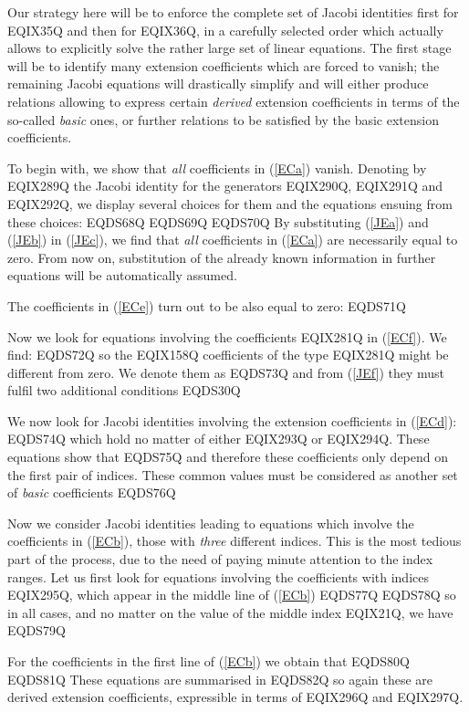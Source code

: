 Our strategy here will be to enforce the complete set of Jacobi
identities  first for EQIX35Q and then for EQIX36Q, in
a carefully selected order which actually allows to explicitly
solve the rather large set of linear equations. The first stage
will be to identify many extension coefficients which are forced to
vanish; the remaining Jacobi equations will drastically simplify
and will either produce relations allowing to express certain
\emph{derived} extension coefficients in terms of the so-called
\emph{basic} ones, or further relations to be satisfied by the basic
extension coefficients.

To begin with, we show that \emph{all} coefficients in
(\ref{ECa}) vanish.  Denoting by EQIX289Q the Jacobi
identity for the generators EQIX290Q,
EQIX291Q and EQIX292Q, we display several choices for them
and the equations ensuing from these choices:
EQDS68Q
EQDS69Q
EQDS70Q
By substituting (\ref{JEa}) and (\ref{JEb}) in (\ref{JEc}), we find
that \emph{all} coefficients in (\ref{ECa})  are necessarily equal to
zero. From now on, substitution of the already known information in
further equations will be automatically assumed.

The coefficients  in (\ref{ECe}) turn out to be also equal to zero:
EQDS71Q

Now we look for equations involving the  coefficients EQIX281Q
in (\ref{ECf}). We find:
EQDS72Q
so the EQIX158Q coefficients of the type EQIX281Q might be
different from zero. We denote them as
EQDS73Q
and from  (\ref{JEf}) they must fulfil two additional conditions
EQDS30Q

We now look for Jacobi identities involving the  extension
coefficients in (\ref{ECd}):
EQDS74Q
which hold no matter of either EQIX293Q or EQIX294Q. These
equations show that
EQDS75Q
and therefore these coefficients  only depend on the first pair of
indices. These common values must be considered as another set of
\emph{basic} coefficients
EQDS76Q

Now we consider Jacobi identities leading to equations which involve
the coefficients in  (\ref{ECb}), those  with \emph{three} different indices. This
is the most tedious part of the process, due to the need of paying
minute attention to the index ranges.  Let us first look for
equations involving the coefficients with indices EQIX295Q, which
appear in the middle line of (\ref{ECb})
EQDS77Q
EQDS78Q
so in all cases, and no matter on the value of the middle index EQIX21Q,
we have
EQDS79Q

For the coefficients in the first line of (\ref{ECb}) we obtain that
EQDS80Q
EQDS81Q
These equations are summarised in
EQDS82Q
so again these are derived extension coefficients, expressible in
terms of EQIX296Q and EQIX297Q.

